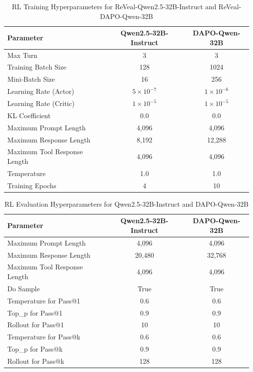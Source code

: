 \documentclass{article} %
\begin{document}
\begin{table}[H]
\centering
\caption{RL Training Hyperparameters for ReVeal-Qwen2.5-32B-Instruct and ReVeal-DAPO-Qwen-32B}
\label{RL_Training_Hyperparameters}
\begin{NiceTabular}{lcc}
\toprule
\textbf{Parameter} & \textbf{Qwen2.5-32B-Instruct} & \textbf{DAPO-Qwen-32B} \\
\midrule
Max Turn & 3 & 3 \\
Training Batch Size & 128 & 1024 \\
Mini-Batch Size & 16 & 256 \\
Learning Rate (Actor) & $5 \times 10^{-7}$ & $1 \times 10^{-6}$ \\
Learning Rate (Critic) & $1 \times 10^{-5}$ & $1 \times 10^{-5}$ \\
KL Coefficient & 0.0 & 0.0 \\
Maximum Prompt Length & 4,096 & 4,096 \\
Maximum Response Length & 8,192 & 12,288 \\
Maximum Tool Response Length & 4,096 & 4,096 \\
Temperature & 1.0 & 1.0 \\
Training Epochs & 4 & 10 \\
\bottomrule
\end{NiceTabular}
\end{table}
\vspace{-1em}
\begin{table}[H]
\centering
\caption{RL Evaluation Hyperparameters for Qwen2.5-32B-Instruct and DAPO-Qwen-32B}
\label{RL_Evaluation_Hyperparameters}
\begin{NiceTabular}{lcc}
\toprule
\textbf{Parameter} & \textbf{Qwen2.5-32B-Instruct} & \textbf{DAPO-Qwen-32B} \\
\midrule
Maximum Prompt Length & 4,096 & 4,096 \\
Maximum Response Length & 20,480 & 32,768 \\
Maximum Tool Response Length & 4,096 & 4,096 \\
Do Sample & True & True \\
Temperature for Pass@1 & 0.6 & 0.6 \\
Top\_p for Pass@1 & 0.9 & 0.9 \\
Rollout for Pass@1 & 10 & 10 \\
Temperature for Pass@k & 0.6 & 0.6 \\
Top\_p for Pass@k & 0.9 & 0.9 \\
Rollout for Pass@k & 128 & 128 \\
\bottomrule
\end{NiceTabular}
\end{table}
\end{document}
